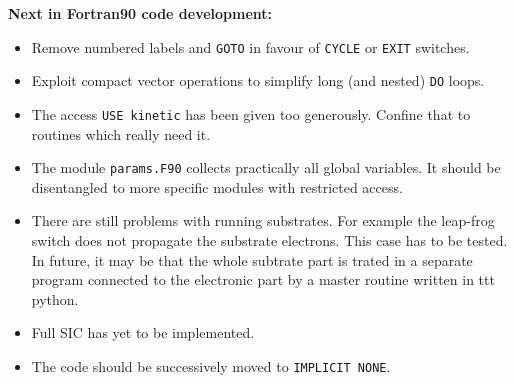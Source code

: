 \documentclass[12pt]{article}
\begin{document}
{\Large\bf Next in Fortran90 code development:}
\begin{itemize}
  \item Remove numbered labels and {\tt GOTO} in favour of
        {\tt CYCLE} or {\tt EXIT} switches.
  \item Exploit compact vector operations to simplify
        long (and nested) {\tt DO} loops.
  \item The access {\tt USE kinetic} has been given too generously.
        Confine that to routines which really need it.
  \item The module {\tt params.F90} collects practically all
        global variables. It should be disentangled to more
        specific modules with restricted access. 
  \item There are still problems with running substrates.
        For example the leap-frog switch does not propagate the
        substrate electrons.
        This case has to be tested.
        \\
        In future, it may be that the whole subtrate part
        is trated in a separate program connected to the electronic
        part by a master routine written in {ttt python}.
  \item Full SIC has yet to be implemented.
  \item The code should be successively moved to {\tt IMPLICIT NONE}.
\end{itemize}

\newpage
\end{document}
